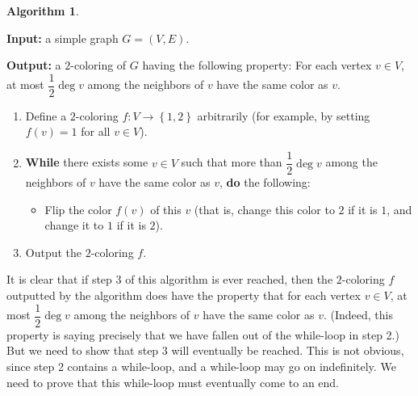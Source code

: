 \documentclass[paper=a4, fontsize=12pt]{scrartcl} %
\newcommand{\set}[1]{\left\{ #1 \right\}}
\newcommand{\tup}[1]{\left( #1 \right)}
\theoremstyle{plainsl}
\theoremstyle{definition}
\newtheorem{algorithm}[theorem]{Algorithm}
\theoremstyle{remark}
\begin{document}
\begin{algorithm} \label{alg.exe1.1}
\begin{leftbar}

\textbf{Input:} a simple graph $G = \tup{V, E}$.

\textbf{Output:} a $2$-coloring of $G$ having the following
property: For each vertex $v \in V$, at most $\dfrac{1}{2} \deg v$
among the neighbors of $v$ have the same color as $v$.

\begin{enumerate}
\item Define a $2$-coloring $f : V \to \set{1, 2}$ arbitrarily (for
      example, by setting $f \tup{v} = 1$ for all $v \in V$).
\item \textbf{While} there exists some $v \in V$ such that
      more than $\dfrac{1}{2} \deg v$ among the neighbors of $v$ have
      the same color as $v$, \textbf{do} the following:
      \begin{itemize}
      \item Flip the color $f \tup{v}$ of this $v$ (that is, change
            this color to $2$ if it is $1$, and change it to $1$ if it
            is $2$).
      \end{itemize}
\item Output the $2$-coloring $f$.
\end{enumerate}
\end{leftbar}
\end{algorithm}

It is clear that if step 3 of this algorithm is ever reached, then the
$2$-coloring $f$ outputted by the algorithm
does have the property that for each vertex
$v \in V$, at most $\dfrac{1}{2} \deg v$ among the neighbors of $v$
have the same color as $v$. (Indeed, this property is saying
precisely that we have fallen out of the while-loop in step 2.) But
we need to show that step 3 will eventually be reached. This is not
obvious, since step 2 contains a while-loop, and a while-loop may go
on indefinitely. We need to prove that this while-loop must eventually
come to an end.
\end{document}

